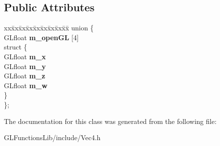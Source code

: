 \subsection*{Public Attributes}
\begin{DoxyCompactItemize}
\item 
\begin{tabbing}
xx\=xx\=xx\=xx\=xx\=xx\=xx\=xx\=xx\=\kill
union \{\\
\>GLfloat {\bfseries m\_openGL} \mbox{[}4\mbox{]}\\
\>struct \{\\
\>\>GLfloat {\bfseries m\_x}\\
\>\>GLfloat {\bfseries m\_y}\\
\>\>GLfloat {\bfseries m\_z}\\
\>\>GLfloat {\bfseries m\_w}\\
\>\} \hypertarget{unionVec4_1_1_0D4_afd2b5891329ef3fc9b8a749eab8b0008}{}\label{unionVec4_1_1_0D4_afd2b5891329ef3fc9b8a749eab8b0008}
\\
\}; \hypertarget{classVec4_a8f0e755891bc3e425a0dcc2d95271128}{}\label{classVec4_a8f0e755891bc3e425a0dcc2d95271128}
\\

\end{tabbing}\end{DoxyCompactItemize}


The documentation for this class was generated from the following file\+:\begin{DoxyCompactItemize}
\item 
G\+L\+Functions\+Lib/include/Vec4.\+h\end{DoxyCompactItemize}
